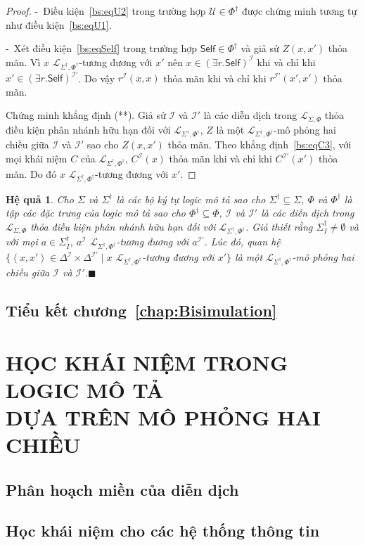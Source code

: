 \documentclass[12pt,a4paper,twoside]{report}
\newcommand{\mL}		{\mathcal{L}}
\newcommand{\mI}		{\mathcal{I}}
\newcommand{\mU}		{\mathcal{U}}
\newcommand{\SigmaDag}	{\Sigma^\dag}
\newcommand{\SigmaDagI}	{\Sigma^\dag_I}
\newcommand{\PhiDag}	{\Phi^\dag}
\newcommand{\Self}		{\mathsf{Self}}
\newcommand{\mLSP}		{\mL_{\Sigma,\Phi}}
\newcommand{\mLSPD}		{\mL_{\Sigma^\dag,\Phi^\dag}}
\newcommand{\semiItem}	{\mbox{- }}
\newcommand{\myend}		{\mbox{}\hfill\mbox{{\scriptsize$\!\blacksquare$}}}
\newcommand{\tuple}[1]	{\left\langle#1\right\rangle\!}
\newcommand{\E}			{\exists}
\newtheorem{Corollary}{Hệ quả}[chapter]
\theoremstyle{definition}
\begin{document}
\begin{proof}
\semiItem Điều kiện~\eqref{bs:eqU2} trong trường hợp $\mU \in \PhiDag$ được chứng minh tương tự như điều kiện~\eqref{bs:eqU1}.

\semiItem Xét điều kiện~\eqref{bs:eqSelf} trong trường hợp $\Self \in \PhiDag$ và giả sử $Z(x,x')$ thỏa mãn. Vì $x$ $\mLSPD$-tương đương với $x'$ nên $x \in (\E r.\Self)^\mI$ khi và chỉ khi $x' \in (\E r.\Self)^{\mI'}$. Do vậy $r^\mI(x,x)$ thỏa mãn khi và chỉ khi $r^{\mI'}(x',x')$ thỏa mãn.

Chứng minh khẳng định (**). Giả sử $\mI$ và $\mI'$ là các diễn dịch trong $\mLSP$ thỏa điều kiện phân nhánh hữu hạn đối với $\mLSPD$, $Z$ là một $\mLSPD$-mô phỏng hai chiều giữa $\mI$ và $\mI'$ sao cho $Z(x,x')$ thỏa mãn. Theo khẳng định~\eqref{bs:eqC3}, với mọi khái niệm $C$ của $\mLSPD$, $C^\mI(x)$ thỏa mãn khi và chỉ khi $C^{\mI'}(x')$ thỏa mãn. Do đó $x$ $\mLSPD$-tương đương với $x'$.
\end{proof}

\begin{Corollary}
Cho $\Sigma$ và $\SigmaDag$ là các bộ ký tự logic mô tả sao cho $\SigmaDag \subseteq \Sigma$, $\Phi$ và $\PhiDag$ là tập các đặc trưng của logic mô tả sao cho $\PhiDag \subseteq \Phi$, $\mI$ và $\mI'$ là các diễn dịch trong $\mLSP$ thỏa điều kiện phân nhánh hữu hạn đối với $\mLSPD$. Giả thiết rằng $\SigmaDagI \not= \emptyset$ và với mọi $a \in \SigmaDagI$, $a^\mI$ $\mLSPD$-tương đương với $a^{\mI'}$.
Lúc đó, quan hệ $\{\tuple{x, x'} \in \Delta^\mI \times \Delta^{\mI'} \mid x $ $\mLSPD$-tương đương với $x'\}$ là một $\mLSPD$-mô phỏng hai chiều giữa $\mI$ và $\mI'$.\myend
\end{Corollary}

\section{Tiểu kết chương~\ref{chap:Bisimulation}}

\chapter{HỌC KHÁI NIỆM TRONG LOGIC MÔ TẢ\\ DỰA TRÊN MÔ PHỎNG HAI CHIỀU}
\label{chap:ConceptLearning}
\section{Phân hoạch miền của diễn dịch}

\section{Học khái niệm cho các hệ thống thông tin}
\end{document}
